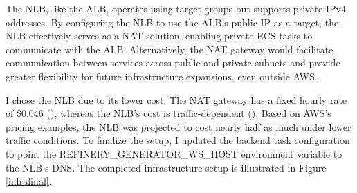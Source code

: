 		The NLB, like the ALB, operates using target groups but supports private IPv4 addresses. 
		By configuring the NLB to use the ALB’s public IP as a target, the NLB effectively serves as a NAT solution, enabling private ECS tasks to communicate with the ALB. 
		Alternatively, the NAT gateway would facilitate communication between services across public and private subnets and provide greater flexibility 
		for future infrastructure expansions, even outside AWS.

		I chose the NLB due to its lower cost. The NAT gateway has a fixed hourly rate of \$0.046 (\cite{natprice}), whereas the NLB’s cost is traffic-dependent (\cite{nlbprice}). 
		Based on AWS’s pricing examples, the NLB was projected to cost nearly half as much under lower traffic conditions. 
		To finalize the setup, I updated the backend task configuration to point the REFINERY\_GENERATOR\_WS\_HOST environment variable to the NLB's DNS. 
		The completed infrastructure setup is illustrated in Figure \ref{infrafinal}.